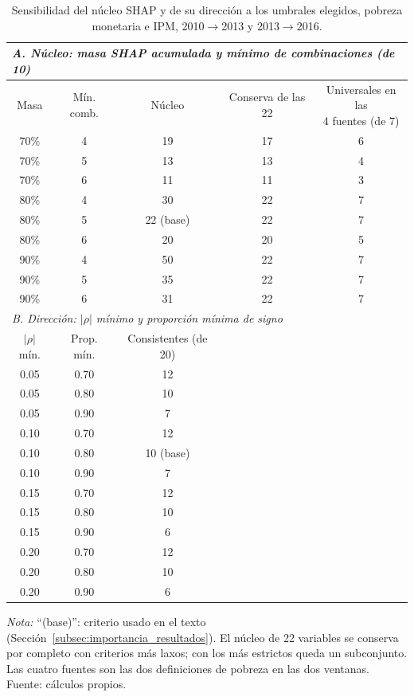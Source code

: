 \begin{table}[H]
  \centering
  \caption{Sensibilidad del núcleo SHAP y de su dirección a los umbrales
  elegidos, pobreza monetaria e IPM, 2010$\to$2013 y 2013$\to$2016.}
  \label{tab:sensibilidad_shap}
  \footnotesize
  \begin{tabular}{ccccc}
    \toprule
    \multicolumn{5}{l}{\textit{A. Núcleo: masa SHAP acumulada y mínimo de combinaciones (de 10)}} \\
    \midrule
    Masa & Mín. comb. & Núcleo & Conserva de las 22 & \shortstack{Universales en las\\4 fuentes (de 7)} \\
    \midrule
    70\% & 4 & 19 & 17 & 6 \\
    70\% & 5 & 13 & 13 & 4 \\
    70\% & 6 & 11 & 11 & 3 \\
    80\% & 4 & 30 & 22 & 7 \\
    80\% & 5 & 22 (base) & 22 & 7 \\
    80\% & 6 & 20 & 20 & 5 \\
    90\% & 4 & 50 & 22 & 7 \\
    90\% & 5 & 35 & 22 & 7 \\
    90\% & 6 & 31 & 22 & 7 \\
    \midrule
    \multicolumn{5}{l}{\textit{B. Dirección: $|\rho|$ mínimo y proporción mínima de signo}} \\
    \midrule
    $|\rho|$ mín. & Prop. mín. & Consistentes (de 20) & & \\
    \midrule
    0.05 & 0.70 & 12 & & \\
    0.05 & 0.80 & 10 & & \\
    0.05 & 0.90 & 7 & & \\
    0.10 & 0.70 & 12 & & \\
    0.10 & 0.80 & 10 (base) & & \\
    0.10 & 0.90 & 7 & & \\
    0.15 & 0.70 & 12 & & \\
    0.15 & 0.80 & 10 & & \\
    0.15 & 0.90 & 6 & & \\
    0.20 & 0.70 & 12 & & \\
    0.20 & 0.80 & 10 & & \\
    0.20 & 0.90 & 6 & & \\
    \bottomrule
  \end{tabular}
  \begin{minipage}{0.95\textwidth}
    \vspace{4pt}
    \footnotesize \textit{Nota:} ``(base)'': criterio usado en el texto
    (Sección~\ref{subsec:importancia_resultados}). El núcleo de 22 variables
    se conserva por completo con criterios más laxos; con los más estrictos
    queda un subconjunto. Las cuatro fuentes son las dos definiciones de
    pobreza en las dos ventanas. Fuente: cálculos propios.
  \end{minipage}
\end{table}